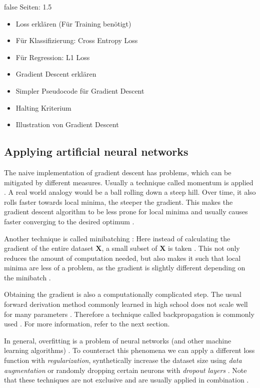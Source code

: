 \documentclass[draft,final,oneside]{vutinfth} %
\begin{document}
\if false
Seiten: 1.5
\begin{itemize}
\item Loss erklären (Für Training benötigt)
\item Für Klassifizierung: Cross Entropy Loss
\item Für Regression: L1 Loss
\item Gradient Descent erklären
\item Simpler Pseudocode für Gradient Descent
\item Halting Kriterium
\item Illustration von Gradient Descent

\end{itemize}
\fi

\subsection{Applying artificial neural networks}

The naive implementation of gradient descent has problems, which can be mitigated by different measures. Usually a technique called momentum is applied \cite{Goodfellow-et-al-2016}. A real world analogy would be a ball rolling down a steep hill. Over time, it also rolls faster towards local minima, the steeper the gradient. This makes the gradient descent algorithm to be less prone for local minima and usually causes faster converging to the desired optimum \cite{Goodfellow-et-al-2016}.

Another technique is called minibatching \cite{Goodfellow-et-al-2016}: Here instead of calculating the gradient of the entire dataset $\boldsymbol{X}$, a small subset of $\boldsymbol{X}$ is taken \cite{Goodfellow-et-al-2016}. This not only reduces the amount of computation needed, but also makes it such that local minima are less of a problem, as the gradient is slightly different depending on the minibatch \cite{Goodfellow-et-al-2016}.

Obtaining the gradient is also a computationally complicated step. The usual forward derivation method commonly learned in high school does not scale well for many parameters \cite{colahbackprop}. Therefore a technique called backpropagation is commonly used \cite{colahbackprop}. For more information, refer to the next section.

In general, overfitting is a problem of neural networks (and other machine learning algorithms) \cite{aimodern}. To counteract this phenomena we can apply a different loss function with \textit{regularization}, synthetically increase the dataset size using \textit{data augmentation} or randomly dropping certain neurons with \textit{dropout layers} \cite{Goodfellow-et-al-2016}. Note that these techniques are not exclusive and are usually applied in combination \cite{Goodfellow-et-al-2016}.
\end{document}

